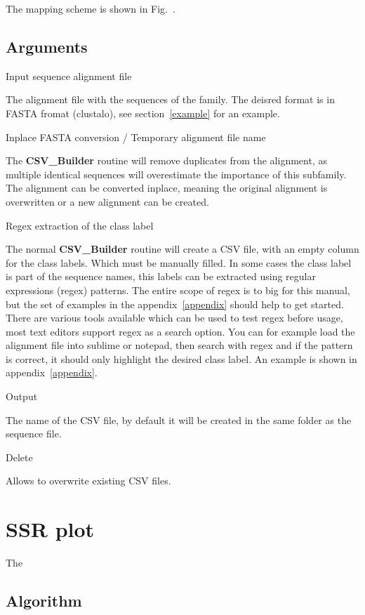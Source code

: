\documentclass[a4paper,10pt]{article}
\begin{document}
The mapping scheme is shown in Fig.~.

\subsection{Arguments}

Input sequence alignment file

The alignment file with the sequences of the family.
The deisred format is in FASTA fromat (clustalo), see section~\ref{example}
for an example.

Inplace FASTA conversion / Temporary alignment file name

The \textbf{CSV\_Builder} routine will remove duplicates from the 
alignment, as multiple identical sequences will overestimate the importance
of this subfamily. The alignment can be converted inplace, meaning
the original alignment is overwritten or a new alignment can be 
created.

Regex extraction of the class label

The normal \textbf{CSV\_Builder} routine will create a CSV file,
with an empty column for the class labels. Which must be manually 
filled.
In some cases the class label is part of the sequence names,
this labels can be extracted using regular expressions (regex) patterns.
The entire scope of regex is to big for this manual, but the set of
examples in the appendix~\ref{appendix} should help to get started. There are various 
tools available which can be used to test regex before usage, most text editors 
support regex as a search option. You can 
for example load the alignment file into sublime or notepad, then
search with regex and if the pattern is correct, it should only highlight 
the desired class label. An example is shown in appendix~\ref{appendix}.

Output

The name of the CSV file, by default it will be created in the same folder as
the sequence file.

Delete

Allows to overwrite existing CSV files.

\section{SSR plot} \label{ssr_p}

The 

\subsection{Algorithm}
\end{document}
